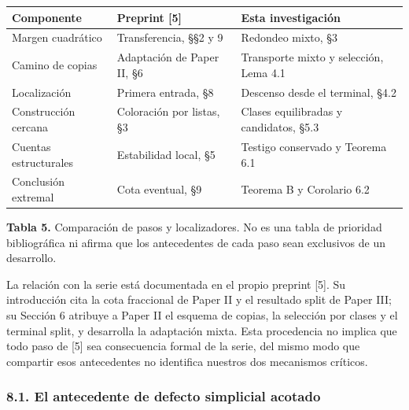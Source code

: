 \documentclass[spanish,11pt,a4paper]{article}
\newcounter{none}
\begin{document}
{\def\LTcaptype{none} %
\begin{longtable}[c]{@{}
  >{\raggedright\arraybackslash}p{}
  >{\raggedright\arraybackslash}p{}
  >{\raggedright\arraybackslash}p{}@{}}
\toprule\noalign{}
\begin{minipage}[b]{\linewidth}\raggedright
Componente
\end{minipage} & \begin{minipage}[b]{\linewidth}\raggedright
Preprint {[}5{]}
\end{minipage} & \begin{minipage}[b]{\linewidth}\raggedright
Esta investigación
\end{minipage} \\
\midrule\noalign{}
\endhead
\bottomrule\noalign{}
\endlastfoot
Margen cuadrático & Transferencia, §§2 y 9 & Redondeo mixto, §3 \\
Camino de copias & Adaptación de Paper II, §6 & Transporte mixto y selección, Lema 4.1 \\
Localización & Primera entrada, §8 & Descenso desde el terminal, §4.2 \\
Construcción cercana & Coloración por listas, §3 & Clases equilibradas y candidatos, §5.3 \\
Cuentas estructurales & Estabilidad local, §5 & Testigo conservado y Teorema 6.1 \\
Conclusión extremal & Cota eventual, §9 & Teorema B y Corolario 6.2 \\
\end{longtable}
}

\textbf{Tabla 5.} Comparación de pasos y localizadores. No es una tabla de prioridad bibliográfica ni afirma que los antecedentes de cada paso sean exclusivos de un desarrollo.

La relación con la serie está documentada en el propio preprint {[}5{]}. Su introducción cita la cota fraccional de Paper II y el resultado split de Paper III; su Sección 6 atribuye a Paper II el esquema de copias, la selección por clases y el terminal split, y desarrolla la adaptación mixta. Esta procedencia no implica que todo paso de {[}5{]} sea consecuencia formal de la serie, del mismo modo que compartir esos antecedentes no identifica nuestros dos mecanismos críticos.

\subsubsection{8.1. El antecedente de defecto simplicial acotado}\label{el-antecedente-de-defecto-simplicial-acotado}
\end{document}
